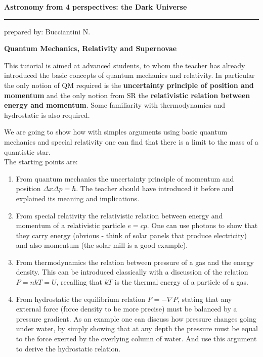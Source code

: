 \documentclass[a4paper,12pt]{article}
\newcommand{\HRule}{\rule{\linewidth}{0.3mm}}
\begin{document}
\pagestyle{empty}

\begin{center}
\LARGE \textbf{Astronomy from 4 perspectives: the Dark Universe}
\HRule
\end{center}
\begin{flushright}
prepared by: Bucciantini N.
\end{flushright}
\begin{center}
{\Large \textbf{Quantum Mechanics, Relativity and Supernovae}}
\end{center}
This tutorial is aimed at advanced students, to whom the teacher has
already introduced the basic concepts of quantum mechanics and
relativity. In particular the only notion of QM required is the {\bf
  uncertainty principle of position and momentum} and the only notion
from SR the {\bf relativistic
relation between energy and momentum}. Some familiarity with
thermodynamics and hydrostatic is also required.

We are going to show how with  simples arguments using basic quantum
mechanics and special relativity one can find that there is a limit to
the mass of a quantistic star.\\

The starting points are:
\begin{enumerate}
\item From quantum mechanics the uncertainty principle  of momentum and
position $\Delta x \Delta p
=\hbar$. The teacher should have introduced it before and explained its
meaning and implications.
\item From special relativity the relativistic relation between energy
  and momentum of a relativistic particle $e=cp$. One can use photons
  to show that they carry energy (obvious - think of solar panels that
  produce electricity) and also momentum (the solar mill is a good example).
\item From thermodynamics the relation between pressure of a gas and
  the energy density. This can be introduced classically with a
  discussion of the relation $P = n kT = U$, recalling that $kT$ is
  the thermal energy of a particle of a gas.
\item From hydrostatic the equilibrium relation $F = -\nabla P$,
  stating that any external force (force density to be more precise) must be balanced by a pressure
  gradient. As an example one can discuss how pressure changes going
  under water, by simply showing that at any depth the pressure must
  be equal to the force exerted by the overlying column of water. And
  use this argument to derive the hydrostatic relation. 
\end{enumerate}
\end{document}
